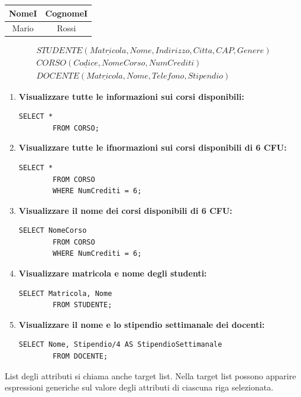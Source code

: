 \documentclass{article}
\begin{document}
\begin{itemize}
\begin{tabular}{|c|c|}
	\hline
	\textbf{NomeI} & \textbf{CognomeI} \\
	\hline
	Mario & Rossi \\
	\hline
\end{tabular}

\begin{align*}
	STUDENTE(\underline{Matricola}, Nome, Indirizzo, Citta, CAP, Genere) \\
	CORSO(\underline{Codice}, NomeCorso, NumCrediti)\\
	DOCENTE(\underline{Matricola}, Nome, Telefono, Stipendio)
\end{align*}

\begin{enumerate}
	\item \textbf{Visualizzare tutte le informazioni sui corsi disponibili:}
	\begin{lstlisting}[style=sqlstyle]
		SELECT *
		FROM CORSO;
	\end{lstlisting}
	
	\item \textbf{Visualizzare tutte le ifnormazioni sui corsi disponibili di 6 CFU:}
		\begin{lstlisting}[style=sqlstyle]
		SELECT *
		FROM CORSO
		WHERE NumCrediti = 6;
	\end{lstlisting}
	\item \textbf{Visualizzare il nome dei corsi disponibili di 6 CFU:}
	\begin{lstlisting}[style=sqlstyle]
		SELECT NomeCorso
		FROM CORSO
		WHERE NumCrediti = 6;
	\end{lstlisting} 
	\item \textbf{Visualizzare matricola e nome degli studenti:}
		\begin{lstlisting}[style=sqlstyle]
		SELECT Matricola, Nome
		FROM STUDENTE;
	\end{lstlisting} 
	\item \textbf{Visualizzare il nome e lo stipendio settimanale dei docenti:}
		\begin{lstlisting}[style=sqlstyle]
		SELECT Nome, Stipendio/4 AS StipendioSettimanale
		FROM DOCENTE;
	\end{lstlisting} 
\end{enumerate}

List degli attributi si chiama anche target list. Nella target list possono apparire espressioni generiche sul valore degli attributi di ciascuna riga selezionata. 


\end{itemize}
\end{document}
